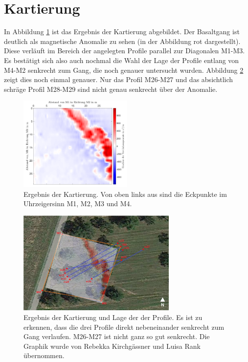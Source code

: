\section{Kartierung}

In Abbildung \ref{fig:Kartierung} ist das Ergebnis der Kartierung abgebildet. Der Basaltgang ist deutlich als magnetische Anomalie zu sehen (in der Abbildung rot dargestellt). Diese verläuft im Bereich der angelegten Profile parallel zur Diagonalen M1-M3. Es bestätigt sich also auch nochmal die Wahl der Lage der Profile entlang von M4-M2 senkrecht zum Gang, die noch genauer untersucht wurden. Abbildung \ref{fig:MagnetikGesamtueberblick} zeigt dies noch einmal genauer. Nur das Profil M26-M27 und das absichtlich schräge Profil M28-M29 sind nicht genau senkrecht über der Anomalie.

\begin{figure}[!ht]
 \centering
 \includegraphics[width=0.5\textwidth]{fig/kartierung_verschwommen.png}
 \caption[Ergebnis der Kartierung]{Ergebnis der Kartierung. Von oben links aus sind die Eckpunkte im Uhrzeigersinn M1, M2, M3 und M4.}
 \label{fig:Kartierung}
\end{figure}

\begin{figure}[!ht]
 \centering
 \includegraphics[width=0.7\textwidth]{fig/MagnetikGesamtueberblick}
 \caption[Ergebnis der Kartierung und Lage der der Profile]{Ergebnis der Kartierung und Lage der der Profile. Es ist zu erkennen, dass die drei Profile direkt nebeneinander senkrecht zum Gang verlaufen. M26-M27 ist nicht ganz so gut senkrecht. Die Graphik wurde von Rebekka Kirchgässner und Luisa Rank übernommen.}
 \label{fig:MagnetikGesamtueberblick}
\end{figure}


